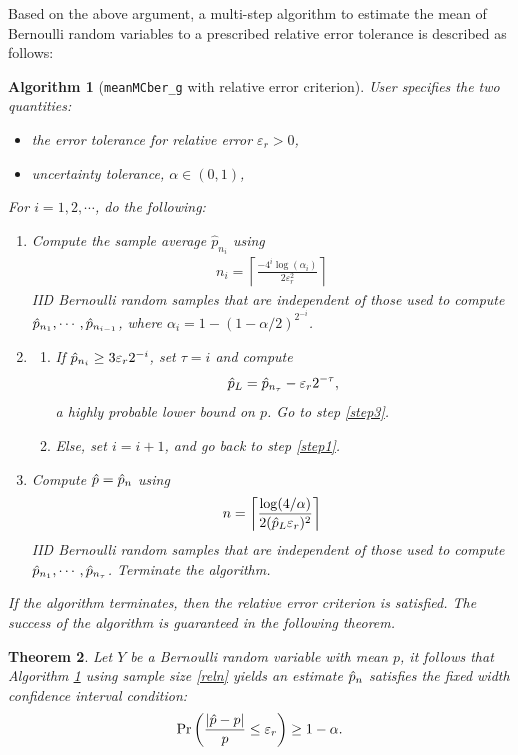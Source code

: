 \documentclass{iitthesis}
\newtheorem{theorem}{Theorem}[section]
\newtheorem{algorithm}[theorem]{Algorithm}
\begin{document}
Based on the above argument, a multi-step algorithm to estimate the mean of Bernoulli random variables to a prescribed relative error tolerance is described as follows:
\begin{algorithm}[{\tt meanMCber\_g} with relative error criterion]\label{algrel}
User specifies the two quantities:
\begin{itemize}
\item the error tolerance for relative error $\varepsilon_r > 0$, 
\item uncertainty tolerance, $\alpha \in (0,1)$, 
\end{itemize}
For $i = 1,2,\cdots$, do the following:
\begin{enumerate}
\item \label{step1} 
Compute the sample average $\hat{p}_{n_i}$ using 
\begin{align}\label{relalgni}
n_i = \left \lceil \frac{-4^i \log\left ( \alpha_i \right)}{2\varepsilon_r^2}\right \rceil
\end{align}
 IID Bernoulli random samples that are independent of those used to compute
$\hat{p}_{n_1},\cdots,\hat{p}_{n_{i-1}}$, where $\alpha_i=1-(1-\alpha/2)^{2^{-i}}$.
\item \label{step2}
\begin{enumerate}
\item If $\hat{p}_{n_i} \geq 3\varepsilon_r 2^{-i}$, set $\tau=i$ and compute 
\begin{align}\label{def:hpl}
\hat{p}_L= \hat{p}_{n_\tau} - \varepsilon_r 2^{-\tau},
\end{align}
 a highly probable lower bound on $p$. Go to step \ref{step3}. 
\item Else, set $i = i+1$, and go back to step \ref{step1}.
\end{enumerate}
    \item \label{step3}
Compute $\hat{p} = \hat{p}_n$ using 
\begin{align}\label{reln}
n= \left \lceil \frac{\log (4/\alpha)}{2(\hat{p}_L\varepsilon_{r})^2} \right \rceil 
\end{align}
  IID Bernoulli random samples that are independent of those used to compute $\hat{p}_{n_1}, \cdots, \hat{p}_{n_\tau}$. Terminate the algorithm.
  \end{enumerate}
If the algorithm terminates, then the relative error criterion is satisfied. The success of the algorithm is guaranteed in the following theorem.
\end{algorithm}
\begin{theorem}
Let $Y$ be a Bernoulli random variable with mean $p$, it follows that Algorithm \ref{algrel} using sample size \eqref{reln} yields an estimate $\hat{p}_n$ satisfies the fixed width confidence interval condition:
\begin{align}\label{probrel}
\Pr\left(\frac{|\hat{p} -p|}{p} \leq \varepsilon_r \right) \geq 1-\alpha.
\end{align}
\end{theorem}
\end{document}
